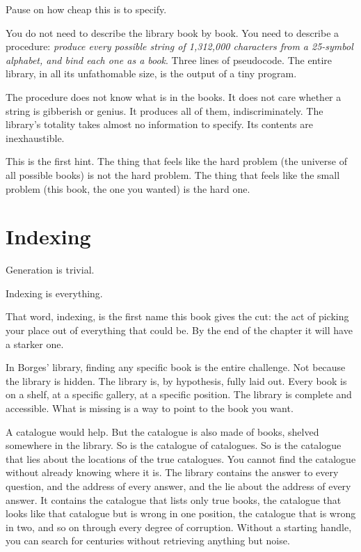 Pause on how cheap this is to specify.

You do not need to describe the library book by book. You need to describe a procedure: \emph{produce every possible string of 1,312,000 characters from a 25-symbol alphabet, and bind each one as a book}. Three lines of pseudocode. The entire library, in all its unfathomable size, is the output of a tiny program.

The procedure does not know what is in the books. It does not care whether a string is gibberish or genius. It produces all of them, indiscriminately. The library's totality takes almost no information to specify. Its contents are inexhaustible.

This is the first hint. The thing that feels like the hard problem (the universe of all possible books) is not the hard problem. The thing that feels like the small problem (this book, the one you wanted) is the hard one.

\section*{Indexing}

Generation is trivial.

Indexing is everything.

That word, indexing, is the first name this book gives the cut: the act of picking your place out of everything that could be. By the end of the chapter it will have a starker one.

In Borges' library, finding any specific book is the entire challenge. Not because the library is hidden. The library is, by hypothesis, fully laid out. Every book is on a shelf, at a specific gallery, at a specific position. The library is complete and accessible. What is missing is a way to point to the book you want.

A catalogue would help. But the catalogue is also made of books, shelved somewhere in the library. So is the catalogue of catalogues. So is the catalogue that lies about the locations of the true catalogues. You cannot find the catalogue without already knowing where it is. The library contains the answer to every question, and the address of every answer, and the lie about the address of every answer. It contains the catalogue that lists only true books, the catalogue that looks like that catalogue but is wrong in one position, the catalogue that is wrong in two, and so on through every degree of corruption. Without a starting handle, you can search for centuries without retrieving anything but noise.

